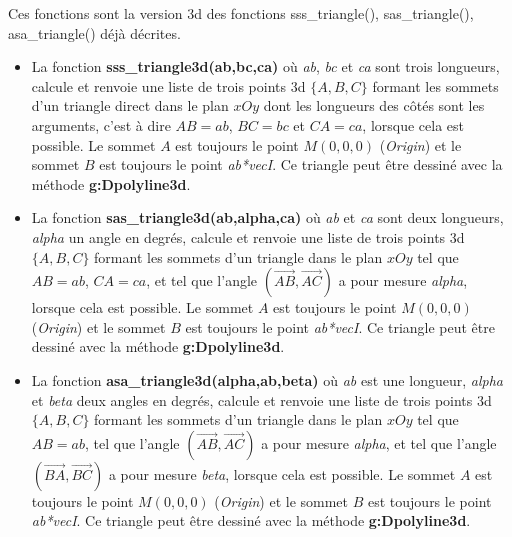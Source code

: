 Ces fonctions sont la version 3d des fonctions  sss\_triangle(), sas\_triangle(), asa\_triangle() déjà décrites.
\begin{itemize}
    \item La fonction \textbf{sss\_triangle3d(ab,bc,ca)} où \emph{ab}, \emph{bc} et \emph{ca} sont trois longueurs, calcule et renvoie une liste de trois points 3d $\{A,B,C\}$ formant les sommets d'un triangle direct dans le plan $xOy$ dont les longueurs des côtés sont les arguments, c'est à dire $AB=ab$, $BC=bc$ et $CA=ca$, lorsque cela est possible. Le sommet $A$ est toujours le point $M(0,0,0)$ (\emph{Origin}) et le sommet $B$ est toujours le point \emph{ab*vecI}. Ce triangle peut être dessiné avec la méthode \textbf{g:Dpolyline3d}.
    \item La fonction \textbf{sas\_triangle3d(ab,alpha,ca)} où \emph{ab} et \emph{ca} sont deux longueurs, \emph{alpha} un angle en degrés, calcule et renvoie une liste de trois points 3d $\{A,B,C\}$ formant les sommets d'un triangle dans le plan $xOy$ tel que $AB=ab$, $CA=ca$, et tel que l'angle $(\vec{AB},\vec{AC})$ a pour mesure \emph{alpha}, lorsque cela est possible. Le sommet $A$ est toujours le point $M(0,0,0)$ (\emph{Origin}) et le sommet $B$ est toujours le point \emph{ab*vecI}. Ce triangle peut être dessiné avec la méthode \textbf{g:Dpolyline3d}.
    \item La fonction \textbf{asa\_triangle3d(alpha,ab,beta)} où \emph{ab} est une longueur, \emph{alpha} et \emph{beta} deux angles en degrés, calcule et renvoie une liste de trois points 3d $\{A,B,C\}$ formant les sommets d'un triangle dans le plan $xOy$ tel que $AB=ab$, tel que l'angle $(\vec{AB},\vec{AC})$ a pour mesure \emph{alpha}, et tel que l'angle $(\vec{BA},\vec{BC})$ a pour mesure \emph{beta}, lorsque cela est possible. Le sommet $A$ est toujours le point $M(0,0,0)$ (\emph{Origin}) et le sommet $B$ est toujours le point \emph{ab*vecI}. Ce triangle peut être dessiné avec la méthode \textbf{g:Dpolyline3d}.
\end{itemize}


